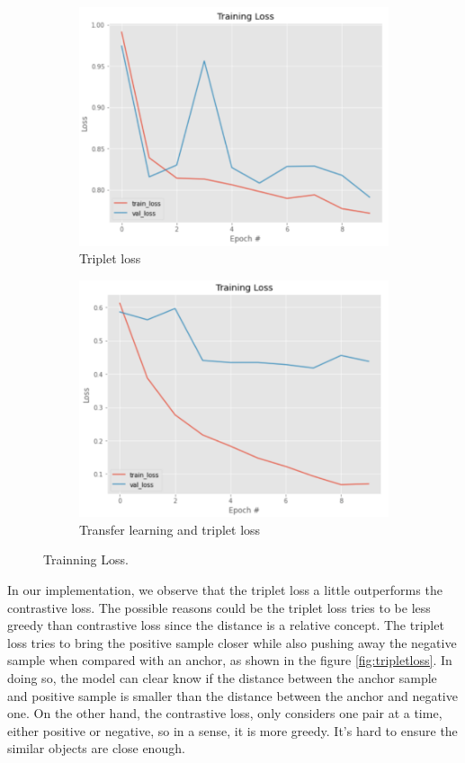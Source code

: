 \begin{figure}[h]
\begin{subfigure}[b]{0.48\linewidth}
   \includegraphics[width=\linewidth]{figs/tri_loss.png}
   \caption{Triplet loss}
   \label{fig:tri_loss}
  \end{subfigure}
    \hfill
    \begin{subfigure}[b]{0.48\linewidth}
   \includegraphics[width=\linewidth]{figs/tri_loss_2.png}
   \caption{Transfer learning and triplet loss}
   \label{fig:tri_loss_2}
  \end{subfigure}
  \hfill
    \caption{Trainning Loss.}
    \label{fig:trainloss}
\end{figure}


In our implementation, we observe that the triplet loss a little outperforms the contrastive loss. The possible reasons could be the triplet loss tries to be less greedy than contrastive loss since the distance is a relative concept. The triplet loss tries to bring the positive sample closer while also pushing away the negative sample when compared with an anchor, as shown in the figure \ref{fig:tripletloss}. In doing so, the model can clear know if the distance between the anchor sample and positive sample is smaller than the distance between the anchor and negative one. On the other hand, the contrastive loss, only considers one pair at a time, either positive or negative, so in a sense, it is more greedy. It's hard to ensure the similar objects are close enough. 

